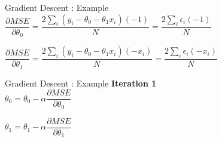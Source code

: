 \documentclass{beamer}
\begin{document}
\begin{frame}{Gradient Descent : Example}
$\dfrac{\partial MSE}{\partial \theta_0} = \dfrac{2\sum\limits_i \left( y_i - \theta_0 -\theta_1x_i \right)\left(-1\right)}{N} = \dfrac{2\sum\limits_i \epsilon_i\left(-1\right)}{N}$  

\vspace{2cm}
$\dfrac{\partial MSE}{\partial \theta_1} = \dfrac{2\sum\limits_i \left( y_i - \theta_0 -\theta_1x_i \right)\left(-x_i\right)}{N} = \dfrac{2\sum\limits_i \epsilon_i\left(-x_i\right)}{N}$ 
\end{frame}

\begin{frame}{Gradient Descent : Example}
\textbf{Iteration 1}\\
\vspace{0.5cm}
$\theta_0 = \theta_0 - \alpha\dfrac{\partial MSE}{\partial \theta_0}$\\ 
\vspace{0.5cm}

$\theta_1 = \theta_1 - \alpha\dfrac{\partial MSE}{\partial \theta_1}$\\ 
\vspace{0.5cm}
\end{frame}
\end{document}
